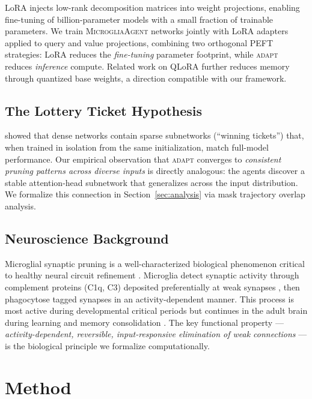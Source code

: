 \documentclass{article}
\newcommand{\agent}{\textsc{MicrogliaAgent}}
\newcommand{\system}{\textsc{adapt}}
\begin{document}
LoRA \citep{hu2022lora} injects low-rank decomposition matrices into weight projections,
enabling fine-tuning of billion-parameter models with a small fraction of trainable parameters.
We train \agent{} networks jointly with LoRA adapters applied to query and value projections,
combining two orthogonal PEFT strategies: LoRA reduces the \emph{fine-tuning} parameter
footprint, while \system{} reduces \emph{inference} compute. Related work on QLoRA
\citep{dettmers2023qlora} further reduces memory through quantized base weights, a direction
compatible with our framework.

\subsection{The Lottery Ticket Hypothesis}
\label{sec:bg_lth}

\citet{frankle2019lottery} showed that dense networks contain sparse subnetworks (``winning
tickets'') that, when trained in isolation from the same initialization, match full-model
performance. Our empirical observation that \system{} converges to \emph{consistent pruning
patterns across diverse inputs} is directly analogous: the agents discover a stable
attention-head subnetwork that generalizes across the input distribution. We formalize this
connection in Section~\ref{sec:analysis} via mask trajectory overlap analysis.

\subsection{Neuroscience Background}
\label{sec:bg_neuro}

Microglial synaptic pruning is a well-characterized biological phenomenon critical to healthy
neural circuit refinement \citep{paolicelli2011synaptic}. Microglia detect synaptic activity
through complement proteins (C1q, C3) deposited preferentially at weak synapses
\citep{stevens2007complement}, then phagocytose tagged synapses in an activity-dependent
manner. This process is most active during developmental critical periods but continues in
the adult brain during learning and memory consolidation \citep{bhatt2009dendritic}. The key
functional property --- \emph{activity-dependent, reversible, input-responsive elimination of
weak connections} --- is the biological principle we formalize computationally.

\section{Method}
\label{sec:method}
\end{document}
